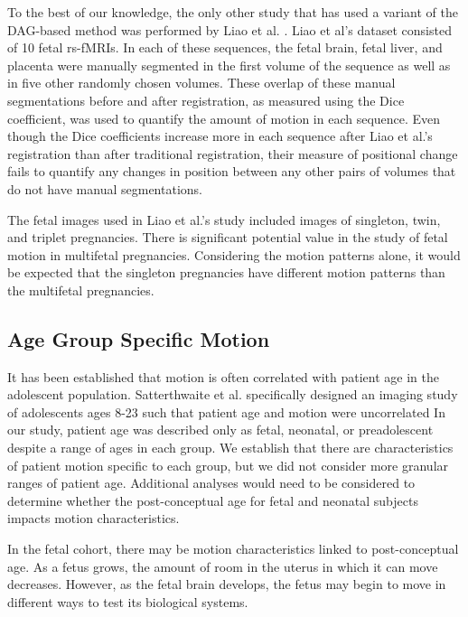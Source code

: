 To the best of our knowledge, the only other study that has used a variant of the DAG-based method was performed by Liao et al. \cite{Liao2016}. Liao et al’s dataset consisted of 10 fetal rs-fMRIs. In each of these sequences, the fetal brain, fetal liver, and placenta were manually segmented in the first volume of the sequence as well as in five other randomly chosen volumes. These overlap of these manual segmentations before and after registration, as measured using the Dice coefficient, was used to quantify the amount of motion in each sequence. Even though the Dice coefficients increase more in each sequence after Liao et al.’s registration than after traditional registration, their measure of positional change fails to quantify any changes in position between any other pairs of volumes that do not have manual segmentations. 

The fetal images used in Liao et al.'s study included images of singleton, twin, and triplet pregnancies. There is significant potential value in the study of fetal motion in multifetal pregnancies. Considering the motion patterns alone, it would be expected that the singleton pregnancies have different motion patterns than the multifetal pregnancies.

\subsection{Age Group Specific Motion}

It has been established that motion is often correlated with patient age in the adolescent population. Satterthwaite et al. specifically designed an imaging study of adolescents ages 8-23 such that patient age and motion were uncorrelated \cite{Satterthwaite2012} %
In our study, patient age was described only as fetal, neonatal, or preadolescent despite a range of ages in each group. We establish that there are characteristics of patient motion specific to each group, but we did not consider more granular ranges of patient age. Additional analyses would need to be considered to determine whether the post-conceptual age for fetal and neonatal subjects impacts motion characteristics. 

In the fetal cohort, there may be motion characteristics linked to post-conceptual age. As a fetus grows, the amount of room in the uterus in which it can move decreases. However, as the fetal brain develops, the fetus may begin to move in different ways to test its biological systems. 

